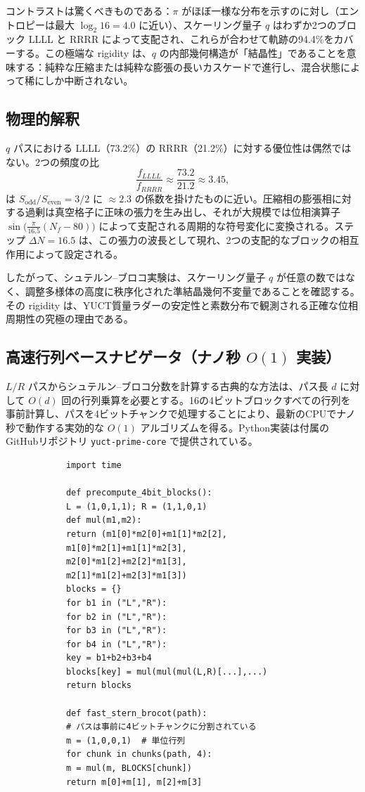 \documentclass[11pt,a4paper]{article}
\begin{document}
	コントラストは驚くべきものである：\(\pi\) がほぼ一様な分布を示すのに対し（エントロピーは最大 \(\log_2 16 = 4.0\) に近い）、スケーリング量子 \(q\) はわずか2つのブロック LLLL と RRRR によって支配され、これらが合わせて軌跡の94.4\%をカバーする。この極端な rigidity は、\(q\) の内部幾何構造が「結晶性」であることを意味する：純粋な圧縮または純粋な膨張の長いカスケードで進行し、混合状態によって稀にしか中断されない。
	
	\subsection{物理的解釈}
	
	\(q\) パスにおける LLLL（73.2\%）の RRRR（21.2\%）に対する優位性は偶然ではない。2つの頻度の比
	\[
	\frac{f_{LLLL}}{f_{RRRR}} \approx \frac{73.2}{21.2} \approx 3.45,
	\]
	は \(S_{\mathrm{odd}}/S_{\mathrm{even}} = 3/2\) に \(\approx 2.3\) の係数を掛けたものに近い。圧縮相の膨張相に対する過剰は真空格子に正味の張力を生み出し、それが大規模では位相演算子 \(\sin\!\bigl(\frac{\pi}{16.5}(N_f-80)\bigr)\) によって支配される周期的な符号変化に変換される。ステップ \(\Delta N = 16.5\) は、この張力の波長として現れ、2つの支配的なブロックの相互作用によって設定される。
	
	したがって、シュテルン–ブロコ実験は、スケーリング量子 \(q\) が任意の数ではなく、調整多様体の高度に秩序化された準結晶幾何不変量であることを確認する。その rigidity は、YUCT質量ラダーの安定性と素数分布で観測される正確な位相周期性の究極の理由である。
	
	\subsection{高速行列ベースナビゲータ（ナノ秒 \(O(1)\) 実装）}
	
	\(L/R\) パスからシュテルン–ブロコ分数を計算する古典的な方法は、パス長 \(d\) に対して \(O(d)\) 回の行列乗算を必要とする。16の4ビットブロックすべての行列を事前計算し、パスを4ビットチャンクで処理することにより、最新のCPUでナノ秒で動作する実効的な \(O(1)\) アルゴリズムを得る。Python実装は付属のGitHubリポジトリ \texttt{yuct-prime-core} で提供されている。
	
	\begin{tcolorbox}[title=4ビットブロックナビゲータ（Python）, breakable]
		\begin{lstlisting}
			import time
			
			def precompute_4bit_blocks():
			L = (1,0,1,1); R = (1,1,0,1)
			def mul(m1,m2):
			return (m1[0]*m2[0]+m1[1]*m2[2],
			m1[0]*m2[1]+m1[1]*m2[3],
			m2[0]*m1[2]+m2[2]*m1[3],
			m2[1]*m1[2]+m2[3]*m1[3])
			blocks = {}
			for b1 in ("L","R"):
			for b2 in ("L","R"):
			for b3 in ("L","R"):
			for b4 in ("L","R"):
			key = b1+b2+b3+b4
			blocks[key] = mul(mul(mul(L,R)[...],...)
			return blocks
			
			def fast_stern_brocot(path):
			# パスは事前に4ビットチャンクに分割されている
			m = (1,0,0,1)  # 単位行列
			for chunk in chunks(path, 4):
			m = mul(m, BLOCKS[chunk])
			return m[0]+m[1], m[2]+m[3]
		\end{lstlisting}
	\end{tcolorbox}
	
\end{document}

